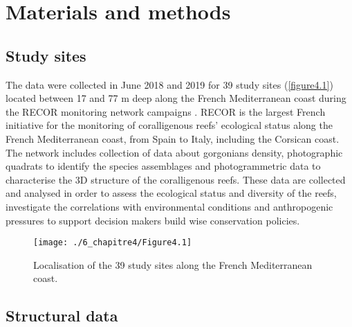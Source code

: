 \section{Materials and methods}\label{chapitre4_2}

\subsection{Study sites}\label{chapitre4_2.1}
The data were collected in June 2018 and 2019 for 39 study sites (\autoref{figure4.1}) located between 17 and 77 m deep along the French Mediterranean coast during the RECOR monitoring network campaigns \citep{andromede-oceanologie_recor_2020}. RECOR is the largest French initiative for the monitoring of coralligenous reefs’ ecological status along the French Mediterranean coast, from Spain to Italy, including the Corsican coast. The network includes collection of data about gorgonians density, photographic quadrats to identify the species assemblages and photogrammetric data to characterise the 3D structure of the coralligenous reefs. These data are collected and analysed in order to assess the ecological status and diversity of the reefs, investigate the correlations with environmental conditions and anthropogenic pressures to support decision makers build wise conservation policies.

\begin{figure}[H]
	\begin{center}
	\texttt{[image: ./6\_chapitre4/Figure4.1]}
		\caption[Localisation of the 39 study sites along the French Mediterranean coast]{Localisation of the 39 study sites along the French Mediterranean coast.}
	\label{figure4.1}
\end{center}
\end{figure}

\newpage

\subsection{Structural data}\label{chapitre4_2.2}

